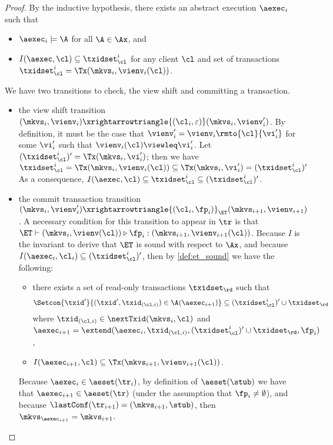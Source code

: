 \begin{proof}
By the inductive hypothesis, there exists an abstract execution $\aexec_i$ such that  
\begin{itemize}
\item $\aexec_{i} \models \A$ for all $\A \in \Ax$, and 
\item $I(\aexec, \cl) \subseteq \txidset_{\cl}^{i}$ for any client $\cl$ and set of transactions $\txidset_{\cl}^{i} = \Tx(\mkvs_{i}, \vienv_{i}(\cl))$.
\end{itemize}

We have two transitions to check, the view shift and committing a transaction.
\begin{itemize}
\item the view shift transition $(\mkvs_{i}, \vienv_{i}) \xrightarrowtriangle{(\cl_{i}, \varepsilon)} (\mkvs_{i}, \vienv'_{i})$. 
By definition, it must be the case that $\vienv'_{i} = \vienv_{i}\rmto{\cl}{\vi'_{i}}$ 
for some $\vi'_{i}$ such that $\vienv_{i}(\cl) \viewleq \vi'_{i}$.
Let $(\txidset_{\cl}^{i})' = \Tx(\mkvs_{i}, \vi'_{i})$; then we have 
\(
\txidset_{\cl}^{i} = \Tx(\mkvs_{i}, \vienv_{i}(\cl)) \subseteq \Tx(\mkvs_{i}, \vi'_{i}) = (\txidset_{\cl}^{i})'
\)
As a consequence, $I(\aexec, \cl) \subseteq \txidset_{\cl}^{i} \subseteq (\txidset_{\cl}^{i})'$.

\item the commit transaction transition $(\mkvs_{i}, \vienv_{i}') \xrightarrowtriangle{(\cl_{i}, \fp_{i})}_{\ET} 
(\mkvs_{i+1}, \vienv_{i+1})$.
A necessary condition for this transition 
to appear in $\tr$ is that $\ET \vdash (\mkvs_{i}, \vienv(\cl)) \triangleright \fp_{i}: (\mkvs_{i+1},\vienv_{i+1}(\cl))$. 
Because $I$ is the invariant to derive that $\ET$ is sound with respect to $\Ax$, 
and because $I(\aexec_{i}, \cl_{i}) \subseteq (\txidset^{i}_{\cl})'$, 
then by \cref{def:et_sound} we have the following:
\begin{itemize}
\item there exists a set of read-only transactions $\txidset_\rd$ 
    such that 
    \[
        \Setcon{\txid' }{ (\txid', \txid_{(\cl, i)}) \in \A(\aexec_{i+1})} \subseteq (\txidset^{i}_{\cl})' \cup \txidset_\rd
    \]
where 
$\txid_{(\cl, i)} \in \nextTxid(\mkvs_{i}, \cl)$
and $\aexec_{i+1} = \extend(\aexec_{i}, \txid_{(\cl, i)}, (\txidset^{i}_{\cl})' \cup \txidset_\rd, \fp_{i})$,
\item  $I(\aexec_{i+1}, \cl) \subseteq \Tx(\mkvs_{i+1}, \vienv_{i+1}(\cl))$.
\end{itemize} 
Because $\aexec_{i} \in \aeset(\tr_{i})$, by definition of $\aeset(\stub)$ we have that 
$\aexec_{i+1} \in \aeset(\tr)$ (under the assumption that $\fp_{i} \neq \emptyset$), 
and because $\lastConf(\tr_{i+1}) = (\mkvs_{i+1}, \stub)$, then $\mkvs_{\aexec_{i+1}} = \mkvs_{i+1}$. 


\end{itemize}
\end{proof}
